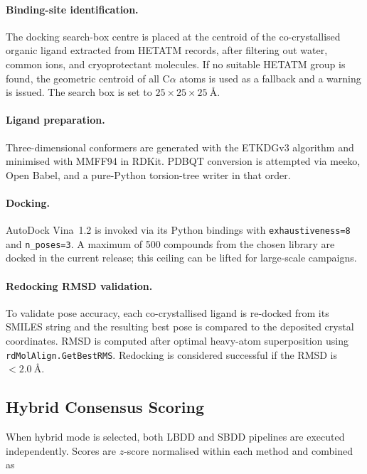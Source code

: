 \documentclass[journal=jcisd8,manuscript=article]{achemso}
\begin{document}
\paragraph{Binding-site identification.}
The docking search-box centre is placed at the centroid of the co-crystallised
organic ligand extracted from HETATM records, after filtering out water,
common ions, and cryoprotectant molecules.  If no suitable HETATM group is
found, the geometric centroid of all C$\alpha$ atoms is used as a fallback
and a warning is issued.  The search box is set to $25 \times 25 \times
\SI{25}{\angstrom}$.

\paragraph{Ligand preparation.}
Three-dimensional conformers are generated with the ETKDGv3 algorithm and
minimised with MMFF94 in RDKit.\cite{riniker2015better}
PDBQT conversion is attempted via meeko, Open Babel, and a pure-Python
torsion-tree writer in that order.

\paragraph{Docking.}
AutoDock Vina~1.2\cite{eberhardt2021autodock} is invoked via its Python
bindings with \texttt{exhaustiveness=8} and \texttt{n\_poses=3}.
A maximum of 500 compounds from the chosen library are docked in the
current release; this ceiling can be lifted for large-scale campaigns.

\paragraph{Redocking RMSD validation.}
To validate pose accuracy, each co-crystallised ligand is re-docked from its
SMILES string and the resulting best pose is compared to the deposited crystal
coordinates.  RMSD is computed after optimal heavy-atom superposition using
\texttt{rdMolAlign.GetBestRMS}.  Redocking is considered successful if the
RMSD is $< \SI{2.0}{\angstrom}$.\cite{trott2010autodock}

\subsection{Hybrid Consensus Scoring}

When hybrid mode is selected, both LBDD and SBDD pipelines are executed
independently.  Scores are $z$-score normalised within each method and
combined as
\end{document}
